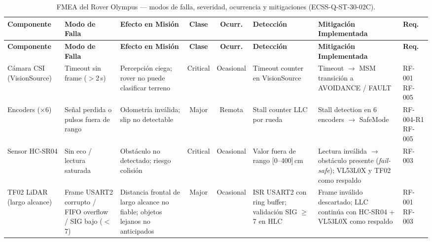 \begin{landscape}
\centering
\scriptsize
\setlength{\tabcolsep}{3pt}
\renewcommand{\arraystretch}{1.3}
\begin{longtable}{| l | p{2.4cm} | p{2.8cm} | c | c | p{2.6cm} | p{3.8cm} | l |}
\caption{FMEA del Rover Olympus — modos de falla, severidad, ocurrencia y mitigaciones (ECSS-Q-ST-30-02C).}
\label{tab:fmea}\\
\hline
\textbf{Componente} & \textbf{Modo de Falla} & \textbf{Efecto en Misión} & \textbf{Clase} & \textbf{Ocurr.} & \textbf{Detección} & \textbf{Mitigación Implementada} & \textbf{Req.} \\ \hline
\endfirsthead
\hline
\textbf{Componente} & \textbf{Modo de Falla} & \textbf{Efecto en Misión} & \textbf{Clase} & \textbf{Ocurr.} & \textbf{Detección} & \textbf{Mitigación Implementada} & \textbf{Req.} \\ \hline
\endhead
\hline
\endfoot
\hline
\endlastfoot

Cámara CSI \newline (VisionSource) &
Timeout sin frame ($>$2\,s) &
Percepción ciega; rover no puede clasificar terreno &
Critical & Ocasional &
Timeout counter en VisionSource &
Timeout $\rightarrow$ MSM transición a AVOIDANCE / FAULT &
RF-001 \newline RF-005 \\ \hline

Encoders ($\times$6) &
Señal perdida o pulsos fuera de rango &
Odometría inválida; slip no detectable &
Major & Remota &
Stall counter LLC por rueda &
Stall detection en 6 encoders $\rightarrow$ SafeMode &
RF-004-R1 \newline RF-005 \\ \hline

Sensor HC-SR04 &
Sin eco / lectura saturada &
Obstáculo no detectado; riesgo colisión &
Critical & Ocasional &
Valor fuera de rango {[}0--400{]}\,cm &
Lectura inválida $\rightarrow$ obstáculo presente (\textit{fail-safe}); VL53L0X y TF02 como respaldo &
RF-003 \\ \hline

TF02 LiDAR \newline (largo alcance) &
Frame USART2 corrupto / FIFO overflow / SIG bajo ($<$7) &
Distancia frontal de largo alcance no fiable; objetos lejanos no anticipados &
Major & Ocasional &
ISR USART2 con ring buffer; validación SIG $\ge$ 7 en HLC &
Frame inválido descartado; LLC continúa con HC-SR04 + VL53L0X como respaldo &
RF-001 \newline RF-003 \\ \hline


\end{longtable}
\end{landscape}
